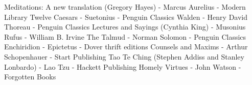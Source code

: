 \begin{thebibliography}{99}

   Meditations: A new translation (Gregory Hayes) - Marcus Aurelius - Modern Library
    Twelve Caesars -  Suetonius - Penguin Classics
     Walden - Henry David Thoreau - Penguin Classics
    Lectures and Sayings (Cynthia King) - Musonius Rufus - William B. Irvine
      The Talmud - Norman Solomon - Penguin Classics
     Enchiridion - Epictetus - Dover thrift editions
    Counsels and Maxims - Arthur Schopenhauer - Start Publishing
    Tao Te Ching (Stephen Addiss and Stanley Lonbardo) - Lao Tzu - Hackett Publishing %
     Homely Virtues - John Watson - Forgotten Books

\end{thebibliography}
